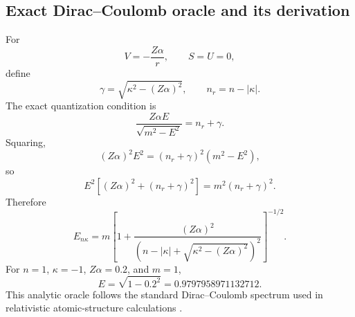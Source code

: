 \documentclass[a4paper,fleqn]{cas-dc}
\begin{document}
\subsection{Exact Dirac--Coulomb oracle and its derivation}
For
\begin{equation}
V=-\frac{Z\alpha}{r},
\qquad
S=U=0,
\end{equation}
define
\begin{equation}
\gamma=\sqrt{\kappa^2-(Z\alpha)^2},
\qquad
n_r=n-|\kappa|.
\end{equation}
The exact quantization condition is
\begin{equation}
\frac{Z\alpha E}{\sqrt{m^2-E^2}}
=n_r+\gamma.
\end{equation}
Squaring,
\begin{equation}
(Z\alpha)^2E^2=(n_r+\gamma)^2(m^2-E^2),
\end{equation}
so
\begin{equation}
E^2\left[(Z\alpha)^2+(n_r+\gamma)^2\right]
=m^2(n_r+\gamma)^2.
\end{equation}
Therefore
\begin{equation}
E_{n\kappa}
=
m\left[
1+\frac{(Z\alpha)^2}
{\left(n-|\kappa|+\sqrt{\kappa^2-(Z\alpha)^2}\right)^2}
\right]^{-1/2}.
\end{equation}
For $n=1$, $\kappa=-1$, $Z\alpha=0.2$, and $m=1$,
\begin{equation}
E=\sqrt{1-0.2^2}=0.9797958971132712.
\end{equation}
This analytic oracle follows the standard Dirac--Coulomb spectrum used in
relativistic atomic-structure calculations \cite{Thaller1992,Grant2007}.
\end{document}
